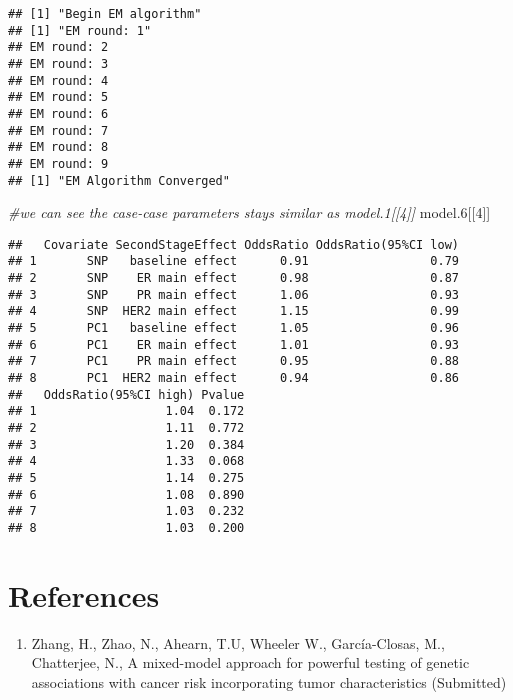 \documentclass[11pt,]{article}
\newenvironment{Shaded}{\begin{snugshade}}{\end{snugshade}}
\newcommand{\CommentTok}[1]{\textcolor[rgb]{0.56,0.35,0.01}{\textit{#1}}}
\newcommand{\DecValTok}[1]{\textcolor[rgb]{0.00,0.00,0.81}{#1}}
\newcommand{\FloatTok}[1]{\textcolor[rgb]{0.00,0.00,0.81}{#1}}
\newcommand{\NormalTok}[1]{#1}
\providecommand{\tightlist}{%
\setlength{\itemsep}{0pt}\setlength{\parskip}{0pt}}
\begin{document}
\begin{verbatim}
## [1] "Begin EM algorithm"
## [1] "EM round: 1"
## EM round: 2
## EM round: 3
## EM round: 4
## EM round: 5
## EM round: 6
## EM round: 7
## EM round: 8
## EM round: 9
## [1] "EM Algorithm Converged"
\end{verbatim}

\begin{Shaded}
\begin{Highlighting}[]
\CommentTok{\#we can see the case{-}case parameters stays similar as model.1[[4]]}
\NormalTok{model}\FloatTok{.6}\NormalTok{[[}\DecValTok{4}\NormalTok{]]}
\end{Highlighting}
\end{Shaded}

\begin{verbatim}
##   Covariate SecondStageEffect OddsRatio OddsRatio(95%CI low)
## 1       SNP   baseline effect      0.91                 0.79
## 2       SNP    ER main effect      0.98                 0.87
## 3       SNP    PR main effect      1.06                 0.93
## 4       SNP  HER2 main effect      1.15                 0.99
## 5       PC1   baseline effect      1.05                 0.96
## 6       PC1    ER main effect      1.01                 0.93
## 7       PC1    PR main effect      0.95                 0.88
## 8       PC1  HER2 main effect      0.94                 0.86
##   OddsRatio(95%CI high) Pvalue
## 1                  1.04  0.172
## 2                  1.11  0.772
## 3                  1.20  0.384
## 4                  1.33  0.068
## 5                  1.14  0.275
## 6                  1.08  0.890
## 7                  1.03  0.232
## 8                  1.03  0.200
\end{verbatim}

\hypertarget{references}{%
\section{References}\label{references}}

\begin{enumerate}
\def\labelenumi{\arabic{enumi}.}
\tightlist
\item
  Zhang, H., Zhao, N., Ahearn, T.U, Wheeler W., García-Closas, M.,
  Chatterjee, N., A mixed-model approach for powerful testing of genetic
  associations with cancer risk incorporating tumor characteristics
  (Submitted)
\end{enumerate}




\newpage
\singlespacing 
\end{document}
